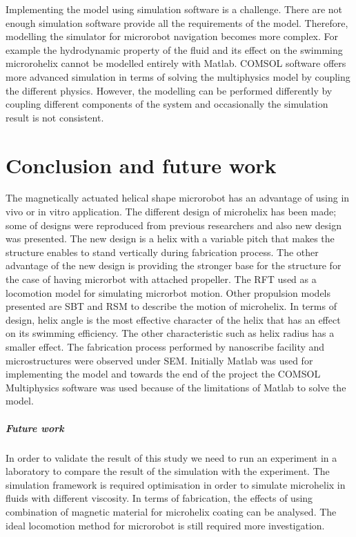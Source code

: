 \documentclass[12pt,a4paper,titlepage]{report}
\begin{document}
Implementing the model using simulation software is a challenge. There are not enough simulation 
software provide all the requirements of the model. Therefore, modelling the simulator for microrobot
 navigation becomes more complex. For example the hydrodynamic property of the fluid and its 
effect on the swimming microrohelix cannot be modelled entirely with Matlab. COMSOL software 
offers more advanced simulation in terms of solving the multiphysics model by coupling the different 
physics. However, the modelling can be performed differently by coupling different components 
of the system and occasionally the simulation result is not consistent.  












\chapter{Conclusion and future work}

The magnetically actuated helical shape microrobot  has an advantage of using in vivo or in 
vitro application. The different design of microhelix has been made; some of designs were 
reproduced from previous researchers and also new design was presented. The new design 
is a helix with a variable pitch that makes the structure enables to stand vertically during fabrication 
process. 
The other advantage of the new design is providing the stronger base for the structure for the case
 of having microrbot with attached propeller. The \ac*{RFT} used as a locomotion model for simulating 
microrbot motion. Other propulsion models presented are \ac*{SBT} and \ac*{RSM} to describe the 
motion of microhelix. In terms of design, helix angle is the most effective character of the helix that has 
an effect on its swimming efficiency. The other characteristic such as helix radius has a smaller effect. 
The fabrication process performed by nanoscribe facility and microstructures were observed 
under \ac*{SEM}. 
Initially Matlab was used for implementing the model and towards the end of the project the 
COMSOL Multiphysics software was used because of the limitations of Matlab to solve the model.  



\paragraph{Future work}
In order to validate the result of this study we need to run an experiment in a laboratory 
to compare the result of the simulation with the experiment. The simulation framework is
 required optimisation in order to simulate microhelix in fluids with different viscosity. In terms 
of fabrication, the effects of using combination of magnetic material for microhelix coating can
 be analysed. The ideal locomotion method for microrobot is still required more investigation. 
\end{document}
